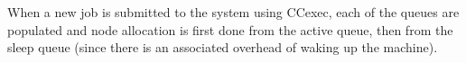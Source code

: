 When a new job is submitted to the system using CCexec, each of the queues are populated and node allocation is first done from the active queue, then from the sleep queue (since there is an associated overhead of waking up the machine). 





